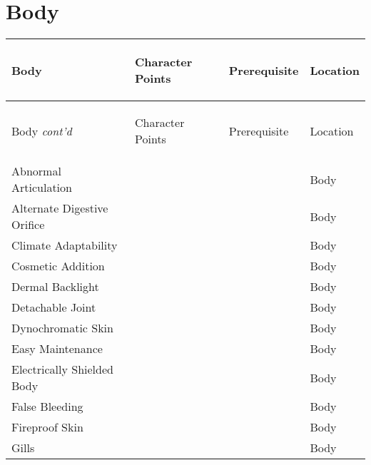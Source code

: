 \documentclass[twoside]{book}
\begin{document}
\begin{multicols}{2}
    \hspace{-2ex}
\vspace{1ex}


    
\end{multicols}
  
    

\section{Body}
    
\begin{longtable}{p{1.25in}p{2em}ll} 
  Body& \begin{turn}{70}{Character Points}\end{turn}
          & \begin{turn}{70}{Prerequisite}\end{turn}
          & \begin{turn}{70}{Location}\end{turn}
          \\
  \hline
  \hline
  \endfirsthead
  Body \textit{cont'd}
        & \begin{turn}{70}{Character Points}\end{turn}
          & \begin{turn}{70}{Prerequisite}\end{turn}
          & \begin{turn}{70}{Location}\end{turn}
           \\
  \hline
  \endhead
\raggedright Abnormal Articulation &&& Body \tabularnewline
      \raggedright Alternate Digestive Orifice
           &&& Body \tabularnewline
      \raggedright Climate Adaptability &&& Body \tabularnewline
      \raggedright Cosmetic Addition &&& Body \tabularnewline
      \raggedright Dermal Backlight &&& Body \tabularnewline
      \raggedright Detachable Joint &&& Body \tabularnewline
      \raggedright Dynochromatic Skin &&& Body \tabularnewline
      \raggedright Easy Maintenance &&& Body \tabularnewline
      \raggedright Electrically Shielded Body
           &&& Body \tabularnewline
      \raggedright False Bleeding &&& Body \tabularnewline
      \raggedright Fireproof Skin &&& Body \tabularnewline
      \raggedright Gills &&& Body \tabularnewline

\end{longtable}
\end{document}
